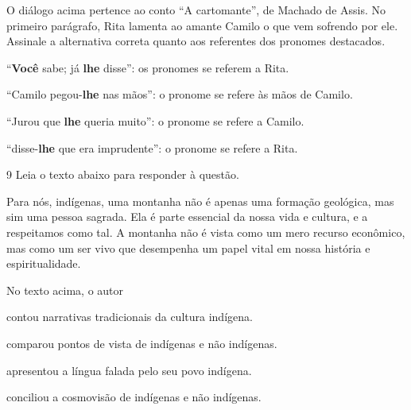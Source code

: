 O diálogo acima pertence ao conto ``A cartomante'', de Machado de Assis.
No primeiro parágrafo, Rita lamenta ao amante Camilo o que vem 
sofrendo por ele. Assinale a alternativa correta quanto aos 
referentes dos pronomes destacados.  

\begin{escolha}

  \item ``\textbf{Você} sabe; já \textbf{lhe} disse'': os pronomes se referem a Rita.
  
  \item ``Camilo pegou-\textbf{lhe} nas mãos'': o pronome se refere às mãos de Camilo.
  
  \item ``Jurou que \textbf{lhe} queria muito'': o pronome se refere a Camilo.
  
  \item ``disse-\textbf{lhe} que era imprudente'': o pronome se refere a Rita.

\end{escolha}

\num{9} Leia o texto abaixo para responder à questão.

\begin{myquote}

Para nós, indígenas, uma montanha não é apenas uma formação geológica, mas sim
uma pessoa sagrada. Ela é parte essencial da nossa vida e cultura, e a
respeitamos como tal. A montanha não é vista como um mero recurso econômico,
mas como um ser vivo que desempenha um papel vital em nossa história e
espiritualidade. 


\end{myquote}

No texto acima, o autor

\begin{escolha}

  \item contou narrativas tradicionais da cultura indígena.

  \item comparou pontos de vista de indígenas e não indígenas.

  \item apresentou a língua falada pelo seu povo indígena.

  \item conciliou a cosmovisão de indígenas e não indígenas.

\end{escolha}

